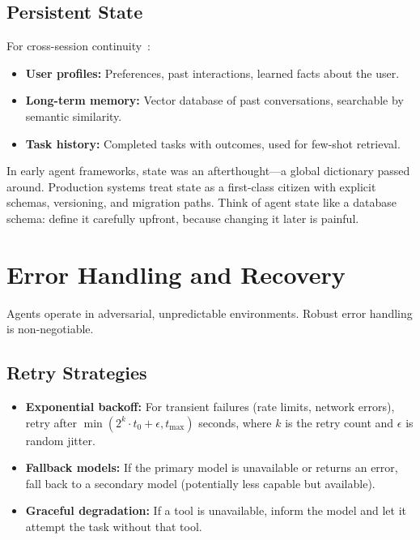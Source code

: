\subsection{Persistent State}
\label{persistent-state}

For cross-session continuity~\cite{packer2023memgpt, wang2023voyager}:

\begin{itemize}
  \item \textbf{User profiles:} Preferences, past interactions, learned facts about the user.
  \item \textbf{Long-term memory:} Vector database of past conversations, searchable by semantic similarity.
  \item \textbf{Task history:} Completed tasks with outcomes, used for few-shot retrieval.
\end{itemize}

\begin{intuitionbox}
In early agent frameworks, state was an afterthought---a global dictionary passed around. Production systems treat state as a first-class citizen with explicit schemas, versioning, and migration paths. Think of agent state like a database schema: define it carefully upfront, because changing it later is painful.
\end{intuitionbox}

\section{Error Handling and Recovery}
\label{subsec:error-handling}

Agents operate in adversarial, unpredictable environments. Robust error handling is non-negotiable.

\subsection{Retry Strategies}
\label{retry-strategies}

\begin{itemize}
  \item \textbf{Exponential backoff:} For transient failures (rate limits, network errors), retry after $\min(2^k \cdot t_0 + \epsilon, t_{\max})$ seconds, where $k$ is the retry count and $\epsilon$ is random jitter.
  \item \textbf{Fallback models:} If the primary model is unavailable or returns an error, fall back to a secondary model (potentially less capable but available).
  \item \textbf{Graceful degradation:} If a tool is unavailable, inform the model and let it attempt the task without that tool.
\end{itemize}


